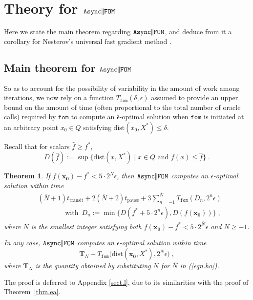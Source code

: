 \documentclass[reqno, 11pt]{amsart}
\newtheorem{thm}[prop]{Theorem}
\numberwithin{equation}{section}
\newcommand{\nt}{\negthinspace}
\newcommand{\fom}{\mathtt{fom}}
\newcommand{\parfom}{\parallel \nt \nt  \mathtt{FOM}}
\newcommand{\tpause}{t_{\mathrm{pause}}}
\newcommand{\ttransit}{t_{\mathrm{transit}}}
\newcommand{\aparfom}{\mathtt{Async} \nt \nt \parfom}
\newcommand{\dist}{\mathrm{dist}}
\begin{document}
\section{{\bf  Theory for $ \aparfom $}}  \label{sect.h}

Here we state the main theorem regarding $ \aparfom $, and deduce from it a corollary for Nesterov's universal fast gradient method \cite{nesterov2015universal}. 

\subsection{Main theorem for $ \aparfom $} \label{sect.ha} 
So as to account for the possibility of variability in the amount of work among iterations, we now rely on a function $ T_{\fom}(\delta, \bar{\epsilon})  $ assumed to provide an upper bound on the amount of time (often proportional to the total number of oracle calls) required by $ \fom $ to compute an $ \bar{\epsilon}  $-optimal solution when $ \fom $ is initiated at an arbitrary point $ x_0 \in Q $ satisfying $ \dist(x_0, X^*) \leq \delta $.

Recall that for scalars $ \hat{f} \geq f^* $, 
\[  
   D(\hat{f}) :=  \sup \{ \dist(x,X^*) \mid  x \in Q  \textrm{ and } f(x) \leq \hat{f} \} \; . 
\]
 

\begin{thm} \label{thm.ha}  
If $ f(\mathbf{x_0}) - f^* < 5 \cdot 2^N \epsilon $, then $ \aparfom $ computes an $ \epsilon $-optimal solution within time
\begin{align} 
  & (\bar{N}+1) \ttransit + 2(\bar{N}+2) \tpause +  3 \sum_{n=-1}^{\bar{N}}  T_{\fom}\left(   D_n , 2^n \epsilon \right)  \label{eqn.ha}   \\   
& \qquad \qquad   \textrm{with } \,    D_n :=   \min \{ D(f^* + 5 \cdot 2^n \epsilon), D( f( \mathbf{x_0})) \}  \; , \nonumber 
\end{align}   
where $ \bar{N} $ is the smallest integer satisfying both $ f(\mathbf{x_0}) - f^* < 5 \cdot 2^{\bar{N}} \epsilon $ and $ \bar{N} \geq -1 $.

In any case, $ \aparfom $ computes an $ \epsilon $-optimal solution within time
\[ 
\mathbf{T}_N + 
  T_{\fom}\big( \dist( \mathbf{x_0}, X^*), 2^{N} \epsilon \big)   \; , 
\]  
 where $ \mathbf{T}_N  $ is the quantity obtained by substituting $ N $ for $ \bar{N} $ in (\ref{eqn.ha}).
\end{thm}

The proof is deferred to Appendix \ref{sect.l}, due to its similarities with the proof of Theorem~\ref{thm.ea}.
\vspace{1mm}
\end{document}
